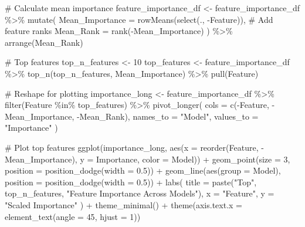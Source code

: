 \documentclass[
  letterpaper,
  DIV=11,
  numbers=noendperiod]{scrreprt}
\newenvironment{Shaded}{\begin{snugshade}}{\end{snugshade}}
\newcommand{\AttributeTok}[1]{\textcolor[rgb]{0.40,0.45,0.13}{#1}}
\newcommand{\CommentTok}[1]{\textcolor[rgb]{0.37,0.37,0.37}{#1}}
\newcommand{\DecValTok}[1]{\textcolor[rgb]{0.68,0.00,0.00}{#1}}
\newcommand{\FloatTok}[1]{\textcolor[rgb]{0.68,0.00,0.00}{#1}}
\newcommand{\FunctionTok}[1]{\textcolor[rgb]{0.28,0.35,0.67}{#1}}
\newcommand{\NormalTok}[1]{\textcolor[rgb]{0.00,0.23,0.31}{#1}}
\newcommand{\OtherTok}[1]{\textcolor[rgb]{0.00,0.23,0.31}{#1}}
\newcommand{\SpecialCharTok}[1]{\textcolor[rgb]{0.37,0.37,0.37}{#1}}
\newcommand{\StringTok}[1]{\textcolor[rgb]{0.13,0.47,0.30}{#1}}
\begin{document}
\begin{Shaded}
\begin{Highlighting}[]
\CommentTok{\# Calculate mean importance}
\NormalTok{feature\_importance\_df }\OtherTok{\textless{}{-}}\NormalTok{ feature\_importance\_df }\SpecialCharTok{\%\textgreater{}\%}
  \FunctionTok{mutate}\NormalTok{(}
    \AttributeTok{Mean\_Importance =} \FunctionTok{rowMeans}\NormalTok{(}\FunctionTok{select}\NormalTok{(., }\SpecialCharTok{{-}}\NormalTok{Feature)),}
    \CommentTok{\# Add feature ranks}
    \AttributeTok{Mean\_Rank =} \FunctionTok{rank}\NormalTok{(}\SpecialCharTok{{-}}\NormalTok{Mean\_Importance)}
\NormalTok{  ) }\SpecialCharTok{\%\textgreater{}\%}
  \FunctionTok{arrange}\NormalTok{(Mean\_Rank)}

\CommentTok{\# Top features}
\NormalTok{top\_n\_features }\OtherTok{\textless{}{-}} \DecValTok{10}
\NormalTok{top\_features }\OtherTok{\textless{}{-}}\NormalTok{ feature\_importance\_df }\SpecialCharTok{\%\textgreater{}\%}
  \FunctionTok{top\_n}\NormalTok{(top\_n\_features, Mean\_Importance) }\SpecialCharTok{\%\textgreater{}\%}
  \FunctionTok{pull}\NormalTok{(Feature)}

\CommentTok{\# Reshape for plotting}
\NormalTok{importance\_long }\OtherTok{\textless{}{-}}\NormalTok{ feature\_importance\_df }\SpecialCharTok{\%\textgreater{}\%}
  \FunctionTok{filter}\NormalTok{(Feature }\SpecialCharTok{\%in\%}\NormalTok{ top\_features) }\SpecialCharTok{\%\textgreater{}\%}
  \FunctionTok{pivot\_longer}\NormalTok{(}
    \AttributeTok{cols =} \FunctionTok{c}\NormalTok{(}\SpecialCharTok{{-}}\NormalTok{Feature, }\SpecialCharTok{{-}}\NormalTok{Mean\_Importance, }\SpecialCharTok{{-}}\NormalTok{Mean\_Rank),}
    \AttributeTok{names\_to =} \StringTok{"Model"}\NormalTok{,}
    \AttributeTok{values\_to =} \StringTok{"Importance"}
\NormalTok{  )}

\CommentTok{\# Plot top features}
\FunctionTok{ggplot}\NormalTok{(importance\_long, }\FunctionTok{aes}\NormalTok{(}\AttributeTok{x =} \FunctionTok{reorder}\NormalTok{(Feature, }\SpecialCharTok{{-}}\NormalTok{Mean\_Importance), }\AttributeTok{y =}\NormalTok{ Importance, }\AttributeTok{color =}\NormalTok{ Model)) }\SpecialCharTok{+}
  \FunctionTok{geom\_point}\NormalTok{(}\AttributeTok{size =} \DecValTok{3}\NormalTok{, }\AttributeTok{position =} \FunctionTok{position\_dodge}\NormalTok{(}\AttributeTok{width =} \FloatTok{0.5}\NormalTok{)) }\SpecialCharTok{+}
  \FunctionTok{geom\_line}\NormalTok{(}\FunctionTok{aes}\NormalTok{(}\AttributeTok{group =}\NormalTok{ Model), }\AttributeTok{position =} \FunctionTok{position\_dodge}\NormalTok{(}\AttributeTok{width =} \FloatTok{0.5}\NormalTok{)) }\SpecialCharTok{+}
  \FunctionTok{labs}\NormalTok{(}
    \AttributeTok{title =} \FunctionTok{paste}\NormalTok{(}\StringTok{"Top"}\NormalTok{, top\_n\_features, }\StringTok{"Feature Importance Across Models"}\NormalTok{),}
    \AttributeTok{x =} \StringTok{"Feature"}\NormalTok{,}
    \AttributeTok{y =} \StringTok{"Scaled Importance"}
\NormalTok{  ) }\SpecialCharTok{+}
  \FunctionTok{theme\_minimal}\NormalTok{() }\SpecialCharTok{+}
  \FunctionTok{theme}\NormalTok{(}\AttributeTok{axis.text.x =} \FunctionTok{element\_text}\NormalTok{(}\AttributeTok{angle =} \DecValTok{45}\NormalTok{, }\AttributeTok{hjust =} \DecValTok{1}\NormalTok{))}
\end{Highlighting}
\end{Shaded}
\end{document}

